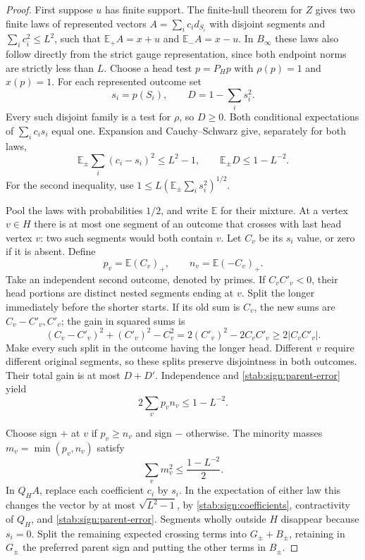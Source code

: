 \begin{proof}
First suppose $u$ has finite support. The finite-hull theorem for
$Z$ gives two finite laws of represented vectors
$A=\sum_i c_i d_{S_i}$ with disjoint segments and
$\sum_i c_i^2\le L^2$, such that
$\mathbb E_+A=x+u$ and $\mathbb E_-A=x-u$.
In $B_\infty$ these laws also follow directly from the strict gauge
representation, since both endpoint norms are strictly less than $L$.
Choose a head test $p=P_Hp$ with $\rho(p)=1$ and $x(p)=1$.
For each represented outcome set
\[
 s_i=p(S_i),\qquad D=1-\sum_i s_i^2.
\]
Every such disjoint family is a test for $\rho$, so $D\ge0$.
Both conditional expectations of $\sum_i c_is_i$ equal one.
Expansion and Cauchy--Schwarz give, separately for both laws,
\begin{equation}\label{stab:sign:parent-error}
 \mathbb E_\pm\sum_i(c_i-s_i)^2\le L^2-1,
 \qquad
 \mathbb E_\pm D\le1-L^{-2}.
\end{equation}
For the second inequality, use
$1\le L(\mathbb E_\pm\sum_i s_i^2)^{1/2}$.

Pool the laws with probabilities $1/2$, and write $\mathbb E$ for
their mixture. At a vertex $v\in H$ there is at most one segment of
an outcome that crosses with last head vertex $v$: two such segments would
both contain $v$. Let $C_v$ be its $s_i$ value, or zero if it is
absent. Define
\[
 p_v=\mathbb E(C_v)_+,\qquad n_v=\mathbb E(-C_v)_+.
\]
Take an independent second outcome, denoted by primes. If
$C_vC'_v<0$, their head portions are distinct nested segments ending
at $v$. Split the longer immediately before the shorter starts.
If its old sum is $C_v$, the new sums are $C_v-C'_v,C'_v$;
the gain in squared sums is
\[
 (C_v-C'_v)^2+(C'_v)^2-C_v^2
       =2(C'_v)^2-2C_vC'_v\ge2|C_vC'_v|.
\]
Make every such split in the outcome having the longer head.
Different $v$ require different original segments, so these splits
preserve disjointness in both outcomes. Their total gain is at most
$D+D'$. Independence and \eqref{stab:sign:parent-error} yield
\begin{equation}\label{stab:sign:parent-conflicts}
 2\sum_v p_vn_v\le1-L^{-2}.
\end{equation}

Choose sign $+$ at $v$ if $p_v\ge n_v$ and sign $-$ otherwise.
The minority masses $m_v=\min(p_v,n_v)$ satisfy
\begin{equation}\label{stab:sign:parent-minority}
 \sum_vm_v^2\le\frac{1-L^{-2}}2.
\end{equation}
In $Q_HA$, replace each coefficient $c_i$ by $s_i$. In the
expectation of either law this changes the vector by at most
$\sqrt{L^2-1}$, by \eqref{stab:sign:coefficients}, contractivity
of $Q_H$, and \eqref{stab:sign:parent-error}. Segments wholly outside
$H$ disappear because $s_i=0$. Split the remaining expected crossing
terms into $G_\pm+B_\pm$, retaining in $G_\pm$ the preferred
parent sign and putting the other terms in $B_\pm$.


\end{proof}

